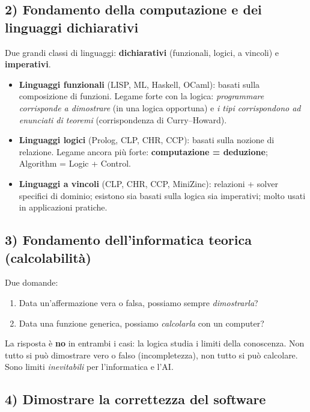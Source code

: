 \subsection{2) Fondamento della computazione e dei linguaggi dichiarativi}

Due grandi classi di linguaggi: \textbf{dichiarativi} (funzionali, logici, a
vincoli) e \textbf{imperativi}.
\begin{itemize}
  \item \textbf{Linguaggi funzionali} (LISP, ML, Haskell, OCaml): basati sulla
        composizione di funzioni. Legame forte con la logica:
        \emph{programmare corrisponde a dimostrare} (in una logica
        opportuna) e \emph{i tipi corrispondono ad enunciati di teoremi}
        (corrispondenza di Curry--Howard).
  \item \textbf{Linguaggi logici} (Prolog, CLP, CHR, CCP): basati sulla nozione
        di relazione. Legame ancora più forte: \textbf{computazione =
        deduzione}; Algorithm = Logic + Control.
  \item \textbf{Linguaggi a vincoli} (CLP, CHR, CCP, MiniZinc): relazioni +
        solver specifici di dominio; esistono sia basati sulla logica sia
        imperativi; molto usati in applicazioni pratiche.
\end{itemize}

\subsection{3) Fondamento dell'informatica teorica (calcolabilità)}

Due domande:
\begin{enumerate}
  \item Data un'affermazione vera o falsa, possiamo sempre \emph{dimostrarla}?
  \item Data una funzione generica, possiamo \emph{calcolarla} con un computer?
\end{enumerate}
La risposta è \textbf{no} in entrambi i casi: la logica studia i limiti della
conoscenza. Non tutto si può dimostrare vero o falso (incompletezza), non
tutto si può calcolare. Sono limiti \emph{inevitabili} per l'informatica e
l'AI.

\subsection{4) Dimostrare la correttezza del software}


